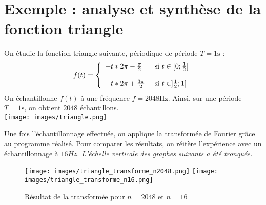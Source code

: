 \documentclass{report}
\begin{document}
	\section{Exemple : analyse et synthèse de la fonction triangle}
	On étudie la fonction triangle suivante, périodique de période $T = 1\text{s}$ :
	\[
		f(t) = 	\left \{
				\begin{array}{l l}
					+t * {2\pi} - \frac{\pi}{2} 	&	\text{ si } t\in[0; \frac{1}{2}] \\
													&	\\
					-t * {2\pi} + \frac{3\pi}{2} 	&	\text{ si } t\in]\frac{1}{2}; 1] \\
				\end{array}
				\right .
	\]
	On échantillonne $f(t)$ à une fréquence $f=2048\text{Hz}$. Ainsi, sur une période $T=1\text{s}$, on obtient $2048$ échantillons.\\
	\texttt{[image: images/triangle.png]}

	Une fois l'échantillonnage effectuée, on applique la transformée de Fourier grâce au programme réalisé. Pour comparer les résultats, on réitère l'expérience avec un échantillonnage à $16Hz$.
	\emph{L'échelle verticale des graphes suivants a été tronquée.}
	
	\clearpage{}

	\begin{figure}
	\begin{center}
		\texttt{[image: images/triangle\_transforme\_n2048.png]}
		\texttt{[image: images/triangle\_transforme\_n16.png]}
	\end{center}
	\caption{Résultat de la transformée pour $n=2048$ et $n=16$}
	\end{figure}

	\clearpage{}
\end{document}
